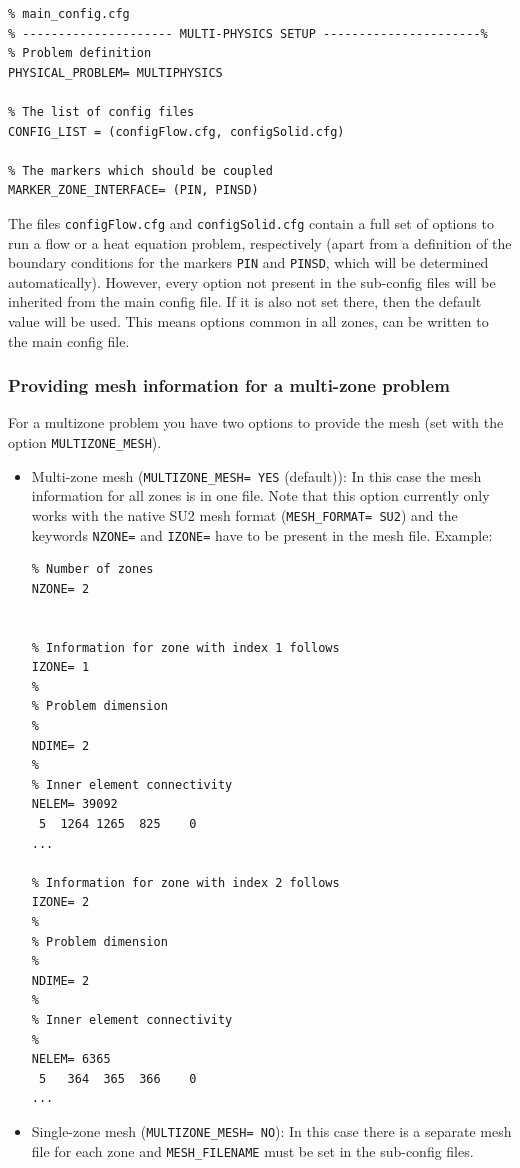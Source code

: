 \documentclass[12pt, a4paper, twoside]{article}
\begin{document}
\begin{lstlisting}
% main_config.cfg
% --------------------- MULTI-PHYSICS SETUP ----------------------%
% Problem definition
PHYSICAL_PROBLEM= MULTIPHYSICS

% The list of config files
CONFIG_LIST = (configFlow.cfg, configSolid.cfg)

% The markers which should be coupled
MARKER_ZONE_INTERFACE= (PIN, PINSD)

\end{lstlisting}


The files \verb|configFlow.cfg| and \verb|configSolid.cfg| contain a full set of options to run a flow or a heat equation problem, respectively (apart from a definition of the boundary conditions for the markers \verb|PIN| and \verb|PINSD|, which will be determined automatically). However, every option not present in the sub-config files will be inherited from the main config file. If it is also not set there, then the default value will be used. This means options common in all zones, can be written to the main config file.

\subsubsection{Providing mesh information for a multi-zone problem}

For a multizone problem you have two options to provide the mesh (set with the option \verb|MULTIZONE_MESH|).

\begin{itemize}
    \item Multi-zone mesh (\verb|MULTIZONE_MESH= YES| (default)): In this case the mesh information for all zones is in one file. Note that this option currently only works with the native SU2 mesh format (\verb|MESH_FORMAT= SU2|) and the keywords \verb|NZONE=| and \verb|IZONE=| have to be present in the mesh file. Example:
    \begin{lstlisting}
% Number of zones
NZONE= 2


% Information for zone with index 1 follows
IZONE= 1
%
% Problem dimension
%
NDIME= 2
%
% Inner element connectivity
NELEM= 39092
 5  1264 1265  825    0
...

% Information for zone with index 2 follows
IZONE= 2
%
% Problem dimension
%
NDIME= 2
%
% Inner element connectivity
%
NELEM= 6365
 5   364  365  366    0
...
\end{lstlisting}
    \item  Single-zone mesh (\verb|MULTIZONE_MESH= NO|): In this case there is a separate mesh file for each zone and \verb|MESH_FILENAME| must be set in the sub-config files.
\end{itemize}
\end{document}
